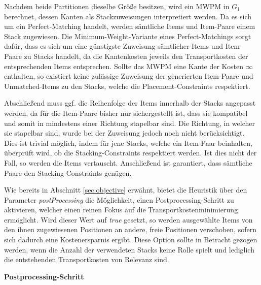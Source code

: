 Nachdem beide Partitionen dieselbe Größe besitzen, wird ein \textsc{MWPM} in $G_1$ berechnet, dessen Kanten als
Stackzuweisungen interpretiert werden. Da es sich um ein Perfect-Matching handelt, werden sämtliche Items und Item-Paare einem Stack zugewiesen. Die Minimum-Weight-Variante eines Perfect-Matchings sorgt dafür, dass es sich um eine günstigste Zuweisung sämtlicher Items und Item-Paare zu Stacks handelt, da die Kantenkosten jeweils den Transportkosten der entsprechenden Items entsprechen. Sollte das \textsc{MWPM} eine Kante der Kosten $\infty$ enthalten, so existiert keine zulässige Zuweisung der generierten Item-Paare und Unmatched-Items zu den Stacks, welche die Placement-Constraints respektiert.

Abschließend muss ggf. die Reihenfolge der Items innerhalb der Stacks angepasst werden, da für die Item-Paare bisher nur sichergestellt ist, dass sie kompatibel und somit in mindestens einer Richtung stapelbar sind. Die Richtung, in welcher sie stapelbar sind, wurde bei der Zuweisung jedoch noch nicht berücksichtigt. Dies ist trivial möglich, indem für jene Stacks, welche ein Item-Paar beinhalten, überprüft wird, ob die Stacking-Constraints respektiert werden. Ist dies nicht der Fall, so werden die Items vertauscht. Anschließend ist garantiert, dass sämtliche Paare den Stacking-Constraints genügen.

Wie bereits in Abschnitt \ref{sec:objective} erwähnt, bietet die Heuristik über den Parameter
\textit{postProcessing} die Möglichkeit, einen Postprocessing-Schritt zu aktivieren, welcher einen reinen Fokus
auf die Transportkostenminimierung ermöglicht. Wird dieser Wert auf \textit{true} gesetzt, so werden
ausgewählte Items von den ihnen zugewiesenen Positionen an andere, freie Positionen verschoben,
sofern sich dadurch eine Kostenersparnis ergibt. Diese Option sollte in Betracht gezogen werden,
wenn die Anzahl der verwendeten Stacks keine Rolle spielt und lediglich die entstehenden Transportkosten
von Relevanz sind.

\textbf{Postprocessing-Schritt}

